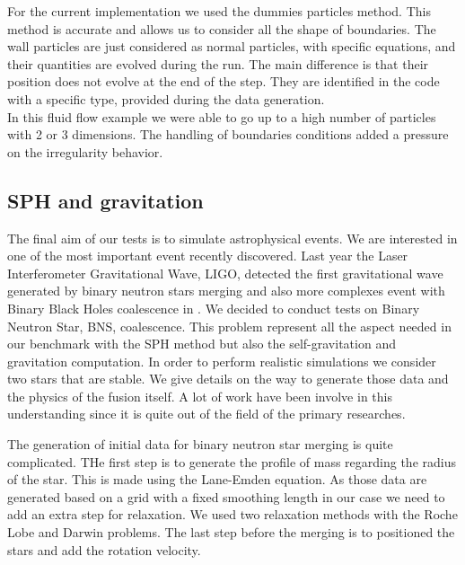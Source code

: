 For the current implementation we used the dummies particles method.
This method is accurate and allows us to consider all the shape of boundaries.
The wall particles are just considered as normal particles, with specific equations, and their quantities are evolved during the run. 
The main difference is that their position does not evolve at the end of the step.
They are identified in the code with a specific type, provided during the data generation.\\ 

In this fluid flow example we were able to go up to a high number of particles with 2 or 3 dimensions. 
The handling of boundaries conditions added a pressure on the irregularity behavior. 

\subsection{SPH and gravitation}

The final aim of our tests is to simulate astrophysical events. 
We are interested in one of the most important event recently discovered. 
Last year the Laser Interferometer Gravitational Wave, LIGO, detected the first gravitational wave generated by binary neutron stars merging \cite{abbott2017gw170817} and also more complexes event with Binary Black Holes coalescence in \cite{abbott2017gw170814}.
We decided to conduct tests on Binary Neutron Star, BNS, coalescence. 
This problem represent all the aspect needed in our benchmark with the SPH method but also the self-gravitation and gravitation computation. 
In order to perform realistic simulations we consider two stars that are stable. 
We give details on the way to generate those data and the physics of the fusion itself. 
A lot of work have been involve in this understanding since it is quite out of the field of the primary researches. 

The generation of initial data for binary neutron star merging is quite complicated. 
THe first step is to generate the profile of mass regarding the radius of the star. 
This is made using the Lane-Emden equation. 
As those data are generated based on a grid with a fixed smoothing length in our case we need to add an extra step for relaxation. 
We used two relaxation methods with the Roche Lobe and Darwin problems. 
The last step before the merging is to positioned the stars and add the rotation velocity. 

